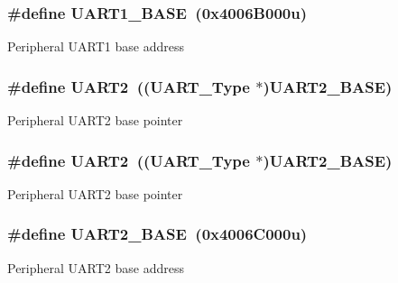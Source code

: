 \subsubsection[{\texorpdfstring{U\+A\+R\+T1\+\_\+\+B\+A\+SE}{UART1_BASE}}]{\setlength{\rightskip}{0pt plus 5cm}\#define U\+A\+R\+T1\+\_\+\+B\+A\+SE~(0x4006\+B000u)}\hypertarget{group__UART__Peripheral__Access__Layer_ga383bf0c4670c3a7fa72df80f66331a46}{}\label{group__UART__Peripheral__Access__Layer_ga383bf0c4670c3a7fa72df80f66331a46}
Peripheral U\+A\+R\+T1 base address 
\subsubsection[{\texorpdfstring{U\+A\+R\+T2}{UART2}}]{\setlength{\rightskip}{0pt plus 5cm}\#define U\+A\+R\+T2~(({\bf U\+A\+R\+T\+\_\+\+Type} $\ast$){\bf U\+A\+R\+T2\+\_\+\+B\+A\+SE})}\hypertarget{group__UART__Peripheral__Access__Layer_ga7f6bd6eb89ae2eeae97af4207ebe3cde}{}\label{group__UART__Peripheral__Access__Layer_ga7f6bd6eb89ae2eeae97af4207ebe3cde}
Peripheral U\+A\+R\+T2 base pointer 
\subsubsection[{\texorpdfstring{U\+A\+R\+T2}{UART2}}]{\setlength{\rightskip}{0pt plus 5cm}\#define U\+A\+R\+T2~(({\bf U\+A\+R\+T\+\_\+\+Type} $\ast$){\bf U\+A\+R\+T2\+\_\+\+B\+A\+SE})}\hypertarget{group__UART__Peripheral__Access__Layer_ga7f6bd6eb89ae2eeae97af4207ebe3cde}{}\label{group__UART__Peripheral__Access__Layer_ga7f6bd6eb89ae2eeae97af4207ebe3cde}
Peripheral U\+A\+R\+T2 base pointer 
\subsubsection[{\texorpdfstring{U\+A\+R\+T2\+\_\+\+B\+A\+SE}{UART2_BASE}}]{\setlength{\rightskip}{0pt plus 5cm}\#define U\+A\+R\+T2\+\_\+\+B\+A\+SE~(0x4006\+C000u)}\hypertarget{group__UART__Peripheral__Access__Layer_gac9998d643534960b684d45a60b998421}{}\label{group__UART__Peripheral__Access__Layer_gac9998d643534960b684d45a60b998421}
Peripheral U\+A\+R\+T2 base address 
